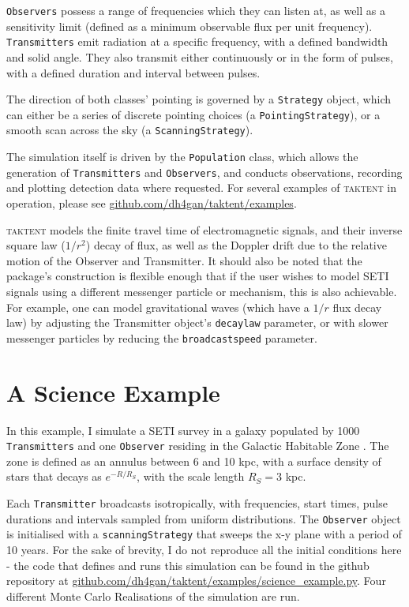 \documentclass[RNAAS]{aastex62}
\begin{document}
\texttt{Observers} possess a range of frequencies which they can listen at, as well as a sensitivity limit (defined as a minimum observable flux per unit frequency).  \texttt{Transmitters} emit radiation at a specific frequency, with a defined bandwidth and solid angle.  They also transmit either continuously or in the form of pulses, with a defined duration and interval between pulses.

The direction of both classes' pointing is governed by a \texttt{Strategy} object, which can either be a series of discrete pointing choices (a \texttt{PointingStrategy}), or a smooth scan across the sky (a \texttt{ScanningStrategy}).

The simulation itself is driven by the \texttt{Population} class, which allows the generation of \texttt{Transmitters} and \texttt{Observers}, and conducts observations, recording and plotting detection data where requested.  For several examples of \textsc{taktent} in operation, please see \url{github.com/dh4gan/taktent/examples}.

\textsc{taktent} models the finite travel time of electromagnetic signals, and their inverse square law ($1/r^2$) decay of flux, as well as the Doppler drift due to the relative motion of the Observer and Transmitter.  It should also be noted that the package's construction is flexible enough that if the user wishes to model SETI signals using a different messenger particle or mechanism, this is also achievable.  For example, one can model gravitational waves (which have a $1/r$ flux decay law) by adjusting the Transmitter object's \texttt{decaylaw} parameter, or with slower messenger particles by reducing the \texttt{broadcastspeed} parameter.

\section{A Science Example}

\noindent In this example, I simulate a SETI survey in a galaxy populated by 1000 \texttt{Transmitters} and one \texttt{Observer} residing in the Galactic Habitable Zone \citep{GHZ,Gowanlock2011}.  The zone is defined as an annulus between 6 and 10 kpc, with a surface density of stars that decays as $e^{-R/R_S}$, with the scale length $R_S=3$ kpc. 

Each \texttt{Transmitter} broadcasts isotropically, with frequencies, start times, pulse durations and intervals sampled from uniform distributions.  The \texttt{Observer} object is initialised with a \texttt{scanningStrategy} that sweeps the x-y plane with a period of 10 years.  For the sake of brevity, I do not reproduce all the initial conditions here - the code that defines and runs this simulation can be found in the github repository at \url{github.com/dh4gan/taktent/examples/science\_example.py}.  Four different Monte Carlo Realisations of the simulation are run.
\end{document}
